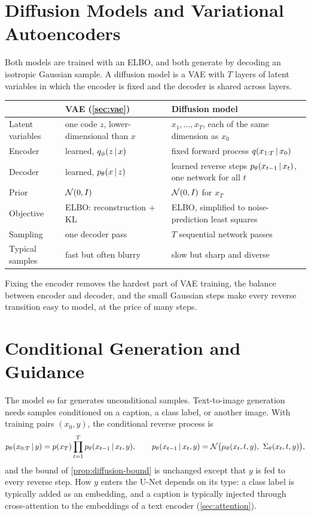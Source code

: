\section{Diffusion Models and Variational Autoencoders}\label{sec:diffusion-vae}

Both models are trained with an ELBO, and both generate by decoding an isotropic Gaussian sample. A diffusion model is a VAE with $T$ layers of latent variables in which the encoder is fixed and the decoder is shared across layers.

\begin{center}
\small
\begin{tabularx}{\textwidth}{@{}l>{\raggedright\arraybackslash}X>{\raggedright\arraybackslash}X@{}}
\toprule
 & VAE (\cref{sec:vae}) & Diffusion model \\
\midrule
Latent variables & one code $z$, lower-dimensional than $x$ & $x_1,\dots,x_T$, each of the same dimension as $x_0$ \\
Encoder & learned, $q_\phi(z\,|\, x)$ & fixed forward process $q(x_{1:T}\,|\, x_0)$ \\
Decoder & learned, $p_\theta(x\,|\, z)$ & learned reverse steps $p_\theta(x_{t-1}\,|\, x_t)$, one network for all $t$ \\
Prior & $\mathcal{N}(0,I)$ & $\mathcal{N}(0,I)$ for $x_T$ \\
Objective & ELBO: reconstruction $+$ KL & ELBO, simplified to noise-prediction least squares \\
Sampling & one decoder pass & $T$ sequential network passes \\
Typical samples & fast but often blurry & slow but sharp and diverse \\
\bottomrule
\end{tabularx}
\end{center}

Fixing the encoder removes the hardest part of VAE training, the balance between encoder and decoder, and the small Gaussian steps make every reverse transition easy to model, at the price of many steps.

\section{Conditional Generation and Guidance}\label{sec:guidance}

The model so far generates unconditional samples. Text-to-image generation needs samples conditioned on a caption, a class label, or another image. With training pairs $(x_0,y)$, the conditional reverse process is
\[
p_\theta(x_{0:T}\given y)=p(x_T)\prod_{t=1}^Tp_\theta(x_{t-1}\given x_t,y),\qquad p_\theta(x_{t-1}\given x_t,y)=\cN\big(\mu_\theta(x_t,t,y),\ \Sigma_\theta(x_t,t,y)\big),
\]
and the bound of \cref{prop:diffusion-bound} is unchanged except that $y$ is fed to every reverse step. How $y$ enters the U-Net depends on its type: a class label is typically added as an embedding, and a caption is typically injected through cross-attention to the embeddings of a text encoder (\cref{sec:attention}).

